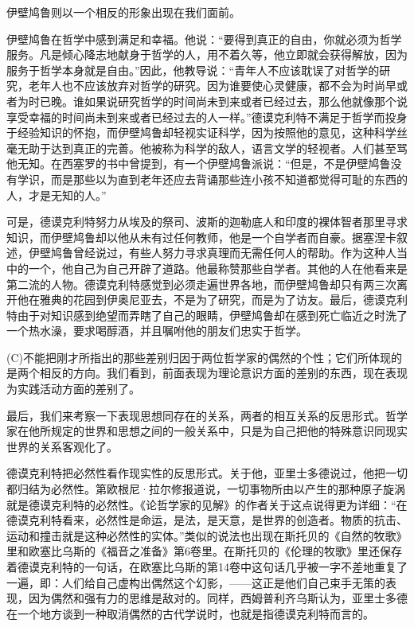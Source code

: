 \documentclass[a4paper,twoside,12pt]{ctexart}
\begin{document}
伊壁鸠鲁则以一个相反的形象出现在我们面前。

伊壁鸠鲁在哲学中感到满足和幸福。他说：“要得到真正的自由，你就必须为哲学服务。凡是倾心降志地献身于哲学的人，用不着久等，他立即就会获得解放，因为服务于哲学本身就是自由。”因此，他教导说：“青年人不应该耽误了对哲学的研究，老年人也不应该放弃对哲学的研究。因为谁要使心灵健康，都不会为时尚早或者为时已晚。谁如果说研究哲学的时间尚未到来或者已经过去，那么他就像那个说享受幸福的时间尚未到来或者已经过去的人一样。”德谟克利特不满足于哲学而投身于经验知识的怀抱，而伊壁鸠鲁却轻视实证科学，因为按照他的意见，这种科学丝毫无助于达到真正的完善。他被称为科学的敌人，语言文学的轻视者。人们甚至骂他无知。在西塞罗的书中曾提到，有一个伊壁鸠鲁派说：“但是，不是伊壁鸠鲁没有学识，而是那些以为直到老年还应去背诵那些连小孩不知道都觉得可耻的东西的人，才是无知的人。”

可是，德谟克利特努力从埃及的祭司、波斯的迦勒底人和印度的裸体智者那里寻求知识，而伊壁鸠鲁却以他从未有过任何教师，他是一个自学者而自豪。据塞涅卡叙述，伊壁鸠鲁曾经说过，有些人努力寻求真理而无需任何人的帮助。作为这种人当中的一个，他自己为自己开辟了道路。他最称赞那些自学者。其他的人在他看来是第二流的人物。德谟克利特感觉到必须走遍世界各地，而伊壁鸠鲁却只有两三次离开他在雅典的花园到伊奥尼亚去，不是为了研究，而是为了访友。最后，德谟克利特由于对知识感到绝望而弄瞎了自己的眼睛，伊壁鸠鲁却在感到死亡临近之时洗了一个热水澡，要求喝醇酒，并且嘱咐他的朋友们忠实于哲学。

(C)不能把刚才所指出的那些差别归因于两位哲学家的偶然的个性；它们所体现的是两个相反的方向。我们看到，前面表现为理论意识方面的差别的东西，现在表现为实践活动方面的差别了。

最后，我们来考察一下表现思想同存在的关系，两者的相互关系的反思形式。哲学家在他所规定的世界和思想之间的一般关系中，只是为自己把他的特殊意识同现实世界的关系客观化了。

德谟克利特把必然性看作现实性的反思形式。关于他，亚里士多德说过，他把一切都归结为必然性。第欧根尼·拉尔修报道说，一切事物所由以产生的那种原子旋涡就是德谟克利特的必然性。《论哲学家的见解》的作者关于这点说得更为详细：“在德谟克利特看来，必然性是命运，是法，是天意，是世界的创造者。物质的抗击、运动和撞击就是这种必然性的实体。”类似的说法也出现在斯托贝的《自然的牧歌》里和欧塞比乌斯的《福音之准备》第6卷里。在斯托贝的《伦理的牧歌》里还保存着德谟克利特的一句话，在欧塞比乌斯的第14卷中这句话几乎被一字不差地重复了一遍，即：人们给自己虚构出偶然这个幻影，——这正是他们自己束手无策的表现，因为偶然和强有力的思维是敌对的。同样，西姆普利齐乌斯认为，亚里士多德在一个地方谈到一种取消偶然的古代学说时，也就是指德谟克利特而言的。
\end{document}
